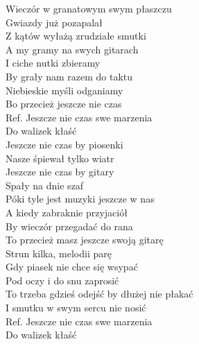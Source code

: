 
\begin{flushleft}
Wieczór w granatowym swym płaszczu \\
Gwiazdy już pozapalał \tab{} \\
Z kątów wyłażą zrudziałe smutki \\
A my gramy na swych gitarach \\
I ciche nutki zbieramy\tab{} \\
By grały nam razem do taktu \tab{}\\
Niebieskie myśli odganiamy \tab{}\\
Bo przecież jeszcze nie czas \tab{}\\
\vskip 3mm
Ref. Jeszcze nie czas swe marzenia  \\
\hspace{0.9cm}Do walizek kłaść \tab{} \\
\hspace{0.9cm}Jeszcze nie czas by piosenki \\
\hspace{0.9cm}Nasze śpiewał tylko wiatr \tab{}\\
\hspace{0.9cm}Jeszcze nie czas by gitary \tab{}\\
\hspace{0.9cm}Spały na dnie szaf \tab{}\\
\hspace{0.9cm}Póki tyle jest muzyki jeszcze w nas \\
\vskip 3mm
A kiedy zabraknie przyjaciół \\
By wieczór przegadać do rana \\
To przecież masz jeszcze swoją gitarę \\
Strun kilka, melodii parę \\
Gdy piasek nie chce się wsypać \\
Pod oczy i do snu zaprosić \\
To trzeba gdzieś odejść by dłużej nie płakać \\
I smutku w swym sercu nie nosić \\
\vskip 3mm
Ref. Jeszcze nie czas swe marzenia \\
\hspace{0.9cm}Do walizek kłaść \\

\end{flushleft}
